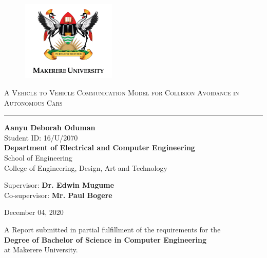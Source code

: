 \documentclass[12pt]{report}
\begin{document}
\begin{titlepage}
\centering

\begin{figure}[H]
\centering
\includegraphics[width=0.4\textwidth]{maklogo.png}%
\end{figure}


\textsc{}


{\huge \textsc{A Vehicle to Vehicle Communication Model for Collision Avoidance in Autonomous Cars}  \\}
\rule{3in}{0.4pt}


{\Large\textbf{Aanyu Deborah Oduman}	 \\}
Student ID: 16/U/2070\\ \vspace{2cm}
{\large \textbf{Department of Electrical and Computer Engineering} \\
School of Engineering \\
College of Engineering, Design, Art and Technology}




{
Supervisor: \textbf{Dr. Edwin Mugume}    \\
Co-supervisor: \textbf{Mr. Paul Bogere} }


December 04, 2020


{
A Report submitted in partial fulfillment of the requirements for the \\ \textbf{ Degree of Bachelor of Science in Computer Engineering} \\ at Makerere University. }


\end{titlepage}
\end{document}
